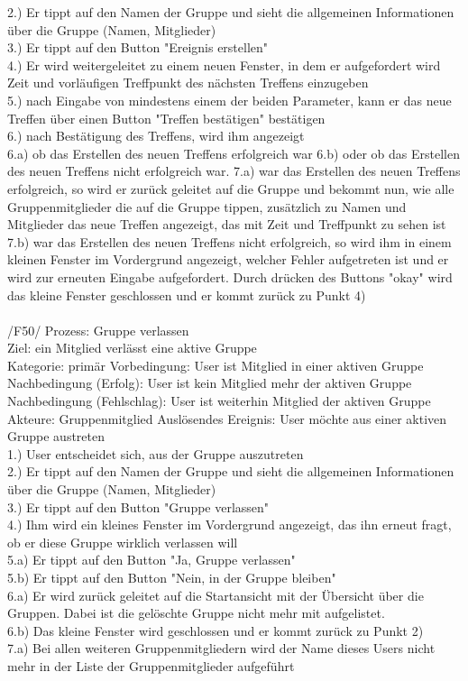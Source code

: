2.) Er tippt auf den Namen der Gruppe und sieht die allgemeinen Informationen über die Gruppe (Namen, Mitglieder)\\
3.) Er tippt auf den Button "Ereignis erstellen"\\
4.) Er wird weitergeleitet zu einem neuen Fenster, in dem er aufgefordert wird Zeit und vorläufigen Treffpunkt des nächsten Treffens einzugeben\\
5.) nach Eingabe von mindestens einem der beiden Parameter, kann er das neue Treffen über einen Button "Treffen bestätigen" bestätigen\\
6.) nach Bestätigung des Treffens, wird ihm angezeigt\\
6.a) ob das Erstellen des neuen Treffens erfolgreich war
6.b) oder ob das Erstellen des neuen Treffens nicht erfolgreich war.
7.a) war das Erstellen des neuen Treffens erfolgreich, so wird er zurück geleitet auf die Gruppe und bekommt nun, wie alle Gruppenmitglieder die auf die Gruppe tippen, zusätzlich zu Namen und Mitglieder das neue Treffen angezeigt, das mit Zeit und Treffpunkt zu sehen ist\\
7.b) war das Erstellen des neuen Treffens nicht erfolgreich, so wird ihm in einem kleinen Fenster im Vordergrund angezeigt, welcher Fehler aufgetreten ist und er wird zur erneuten Eingabe aufgefordert. Durch drücken des Buttons "okay" wird das kleine Fenster geschlossen und er kommt zurück zu Punkt 4)\\ \\
/F50/ Prozess: Gruppe verlassen\\
Ziel: ein Mitglied verlässt eine aktive Gruppe\\
Kategorie: primär
Vorbedingung: User ist Mitglied in einer aktiven Gruppe
Nachbedingung (Erfolg): User ist kein Mitglied mehr der aktiven Gruppe\\
Nachbedingung (Fehlschlag): User ist weiterhin Mitglied der aktiven Gruppe\\
Akteure: Gruppenmitglied
Auslösendes Ereignis: User möchte aus einer aktiven Gruppe austreten\\
1.) User entscheidet sich, aus der Gruppe auszutreten\\
2.) Er tippt auf den Namen der Gruppe und sieht die allgemeinen Informationen über die Gruppe (Namen, Mitglieder)\\
3.) Er tippt auf den Button "Gruppe verlassen"\\
4.) Ihm wird ein kleines Fenster im Vordergrund angezeigt, das ihn erneut fragt, ob er diese Gruppe wirklich verlassen will\\
5.a) Er tippt auf den Button "Ja, Gruppe verlassen"\\
5.b) Er tippt auf den Button "Nein, in der Gruppe bleiben"\\
6.a) Er wird zurück geleitet auf die Startansicht mit der Übersicht über die Gruppen. Dabei ist die gelöschte Gruppe nicht mehr mit aufgelistet.\\
6.b) Das kleine Fenster wird geschlossen und er kommt zurück zu Punkt 2)\\
7.a) Bei allen weiteren Gruppenmitgliedern wird der Name dieses Users nicht mehr in der Liste der Gruppenmitglieder aufgeführt\\

